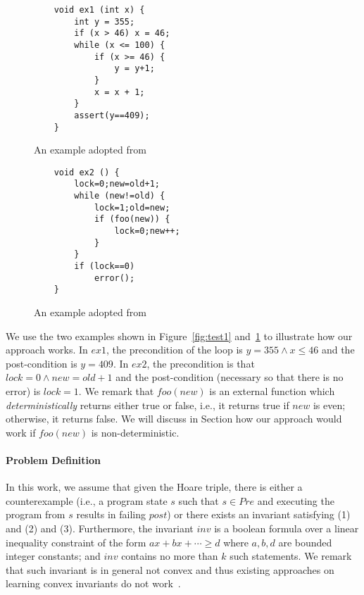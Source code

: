 \begin{figure}[t]
\centering
\begin{minipage}{.5\textwidth}
  \centering
{\scriptsize
\begin{verbatim}
    void ex1 (int x) {
        int y = 355;
        if (x > 46) x = 46;
        while (x <= 100) {
            if (x >= 46) {
                y = y+1;
            }
            x = x + 1;
        }
        assert(y==409);
    }
\end{verbatim}}
  \caption{An example adopted from~\cite{DBLP:conf/popl/GulwaniJ07}}
  \label{fig:test1}
\end{minipage}%
\begin{minipage}{.5\textwidth}
  \centering
{\scriptsize\begin{verbatim}
    void ex2 () {
        lock=0;new=old+1;
        while (new!=old) {
            lock=1;old=new;
            if (foo(new)) {
                lock=0;new++;
            }
        }
        if (lock==0)
            error();
    }
\end{verbatim}}
  \caption{An example adopted from~\cite{DBLP:conf/popl/HenzingerJMS02}}
  \label{fig:test2}
\end{minipage}
\end{figure}

\begin{example}
We use the two examples shown in Figure~\ref{fig:test1} and~\ref{fig:test2} to illustrate how our approach works. 
In $ex1$, the precondition of the loop is $y = 355 \land x \leq 46$ and the post-condition is $y=409$. 
In $ex2$, the precondition is that $lock=0 \land new=old+1$ and the post-condition (necessary so that there is no error) is $lock=1$. 
We remark that $foo(new)$ is an external function which \emph{deterministically} returns either true or false, 
i.e., it returns true if $new$ is even; otherwise, it returns false. 
We will discuss in Section how our approach would work if $foo(new)$ is non-deterministic.
\end{example}

\paragraph{Problem Definition} In this work, we assume that given the Hoare triple, 
there is either a counterexample (i.e., a program state $s$ such that $s \in Pre$ and executing the program from $s$ results in failing $post$) 
or there exists an invariant satisfying (1) and (2) and (3). 
Furthermore, the invariant $inv$ is a boolean formula over a linear inequality constraint 
of the form $ax + bx + \cdots \geq d$ where $a,b,d$ are bounded integer constants; 
and $inv$ contains no more than $k$ such statements. 
We remark that such invariant is in general not convex and thus existing approaches on learning convex invariants do not work~\cite{}.

